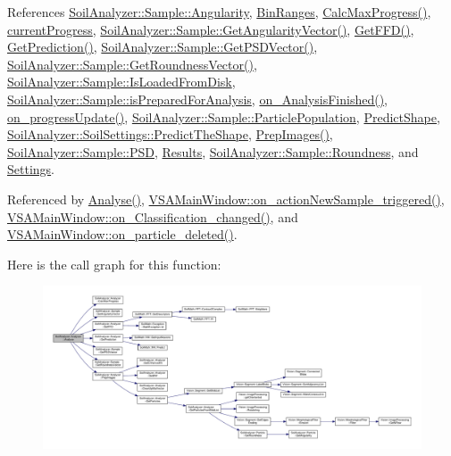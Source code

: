 References \hyperlink{sample_8h_source_l00045}{Soil\+Analyzer\+::\+Sample\+::\+Angularity}, \hyperlink{analyzer_8h_source_l00069}{Bin\+Ranges}, \hyperlink{analyzer_8cpp_source_l00112}{Calc\+Max\+Progress()}, \hyperlink{analyzer_8h_source_l00067}{current\+Progress}, \hyperlink{sample_8cpp_source_l00072}{Soil\+Analyzer\+::\+Sample\+::\+Get\+Angularity\+Vector()}, \hyperlink{analyzer_8cpp_source_l00350}{Get\+F\+F\+D()}, \hyperlink{analyzer_8cpp_source_l00373}{Get\+Prediction()}, \hyperlink{sample_8cpp_source_l00061}{Soil\+Analyzer\+::\+Sample\+::\+Get\+P\+S\+D\+Vector()}, \hyperlink{sample_8cpp_source_l00083}{Soil\+Analyzer\+::\+Sample\+::\+Get\+Roundness\+Vector()}, \hyperlink{sample_8h_source_l00069}{Soil\+Analyzer\+::\+Sample\+::\+Is\+Loaded\+From\+Disk}, \hyperlink{sample_8h_source_l00057}{Soil\+Analyzer\+::\+Sample\+::is\+Prepared\+For\+Analysis}, \hyperlink{class_soil_analyzer_1_1_analyzer_a49245eaf7ee46c065e0a1a71135b6904}{on\+\_\+\+Analysis\+Finished()}, \hyperlink{class_soil_analyzer_1_1_analyzer_a808a8c21029471c4af0be996cb67d14c}{on\+\_\+progress\+Update()}, \hyperlink{sample_8h_source_l00041}{Soil\+Analyzer\+::\+Sample\+::\+Particle\+Population}, \hyperlink{analyzer_8h_source_l00036}{Predict\+Shape}, \hyperlink{soilsettings_8h_source_l00104}{Soil\+Analyzer\+::\+Soil\+Settings\+::\+Predict\+The\+Shape}, \hyperlink{analyzer_8cpp_source_l00033}{Prep\+Images()}, \hyperlink{sample_8h_source_l00043}{Soil\+Analyzer\+::\+Sample\+::\+P\+S\+D}, \hyperlink{analyzer_8h_source_l00049}{Results}, \hyperlink{sample_8h_source_l00044}{Soil\+Analyzer\+::\+Sample\+::\+Roundness}, and \hyperlink{analyzer_8h_source_l00047}{Settings}.



Referenced by \hyperlink{analyzer_8cpp_source_l00054}{Analyse()}, \hyperlink{vsamainwindow_8cpp_source_l00361}{V\+S\+A\+Main\+Window\+::on\+\_\+action\+New\+Sample\+\_\+triggered()}, \hyperlink{vsamainwindow_8cpp_source_l00522}{V\+S\+A\+Main\+Window\+::on\+\_\+\+Classification\+\_\+changed()}, and \hyperlink{vsamainwindow_8cpp_source_l00539}{V\+S\+A\+Main\+Window\+::on\+\_\+particle\+\_\+deleted()}.



Here is the call graph for this function\+:
\nopagebreak
\begin{figure}[H]
\begin{center}
\leavevmode
\includegraphics[width=350pt]{class_soil_analyzer_1_1_analyzer_a1cb605c255d35e85ccaae06a76917188_cgraph}
\end{center}
\end{figure}





